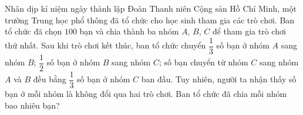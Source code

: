 \begin{bt}
	Nhân dịp kỉ niệm ngày thành lập Đoàn Thanh niên Cộng sản Hồ Chí Minh, một trường Trung học phổ thông đã tổ chức cho học sinh tham gia các trò chơi. Ban tổ chức đã chọn $100$ bạn và chia thành ba nhóm $A$, $B$, $C$ để tham gia trò chơi thứ nhất. Sau khi trò chơi kết thúc, ban tổ chức chuyển $\dfrac{1}{3}$ số bạn ở nhóm $A$ sang nhóm $B$; $\dfrac{1}{2}$ số bạn ở nhóm $B$ sang nhóm $C$; số bạn chuyển từ nhóm $C$ sang nhóm $A$ và $B$ đều bằng $\dfrac{1}{3}$ số bạn ở nhóm $C$ ban đầu. Tuy nhiên, người ta nhận thấy số bạn ở mỗi nhóm là không đổi qua hai trò chơi. Ban tổ chức đã chia mỗi nhóm bao nhiêu bạn?
\end{bt}



